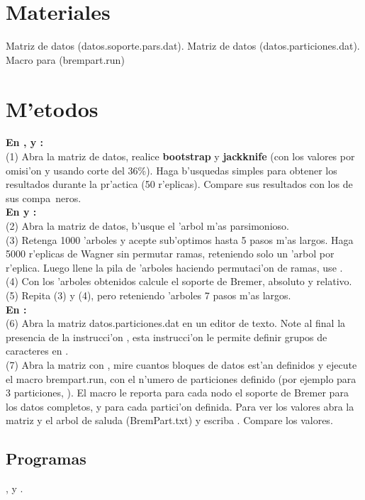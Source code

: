 \section{Materiales}
\noindent
Matriz de datos (datos.soporte.pars.dat).
Matriz de datos (datos.particiones.dat).
Macro para  (brempart.run)
\section{M'etodos}
\noindent
\textbf{En ,  y :}\\
(1) Abra la matriz de datos, realice \textbf{bootstrap} y \textbf{jackknife} (con los valores por omisi'on y usando corte del 36\%). Haga b'usquedas simples para obtener los resultados durante la pr'actica (50 r'eplicas). Compare sus resultados con los de sus compa~neros.\\
\textbf{En  y :}\\
(2) Abra la matriz de datos, b'usque el 'arbol m'as parsimonioso.\\
(3) Retenga 1000 'arboles y acepte sub'optimos hasta  5 pasos m'as largos. Haga 5000 r'eplicas de Wagner sin permutar ramas, reteniendo solo un 'arbol por r'eplica. Luego llene la pila de 'arboles haciendo permutaci'on de ramas, use .\\
(4) Con los 'arboles obtenidos calcule el soporte de Bremer, absoluto y relativo.\\
(5) Repita (3) y (4), pero reteniendo 'arboles 7 pasos m'as largos.\\
\textbf{En :}\\
(6) Abra la matriz datos.particiones.dat en un editor de texto. Note al final la presencia de la instrucci'on , esta instrucci'on le permite definir grupos de caracteres en .\\
(7) Abra la matriz con , mire cuantos bloques de datos est'an definidos y ejecute el macro brempart.run, con el n'umero de particiones definido (por ejemplo para 3 particiones, ). El macro le reporta para cada nodo el soporte de Bremer para los datos completos, y para cada partici'on definida. Para ver los valores abra la matriz y el arbol de saluda (BremPart.txt) y escriba . Compare los valores.
\subsection{Programas}
\noindent
{},  y .
